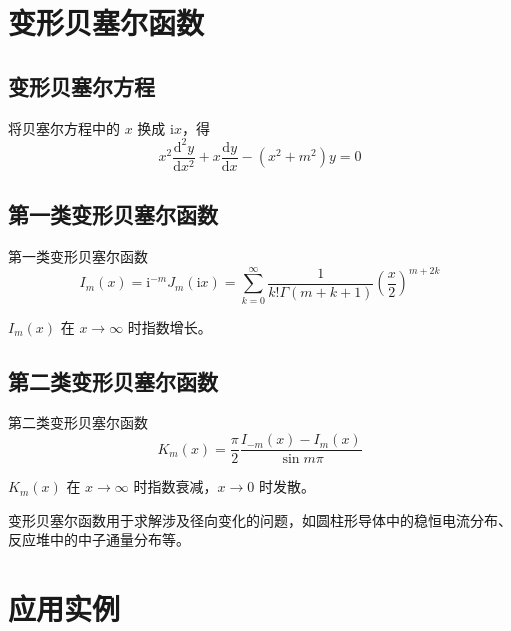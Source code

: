 \section{变形贝塞尔函数}

\subsection{变形贝塞尔方程}

将贝塞尔方程中的 $x$ 换成 $\mathrm{i}x$，得
\begin{equation}
    x^2\frac{\mathrm{d}^2 y}{\mathrm{d}x^2} + x\frac{\mathrm{d}y}{\mathrm{d}x} - (x^2 + m^2)y = 0
\end{equation}

\subsection{第一类变形贝塞尔函数}

\begin{dingliyi}{第一类变形贝塞尔函数}{}
\begin{equation}
    \boxed{I_m(x) = \mathrm{i}^{-m}J_m(\mathrm{i}x) = \sum_{k=0}^{\infty} \frac{1}{k!\Gamma(m+k+1)}\left(\frac{x}{2}\right)^{m+2k}}
\end{equation}
\end{dingliyi}

$I_m(x)$ 在 $x \to \infty$ 时指数增长。

\subsection{第二类变形贝塞尔函数}

\begin{dingliyi}{第二类变形贝塞尔函数}{}
\begin{equation}
    K_m(x) = \frac{\pi}{2}\frac{I_{-m}(x) - I_m(x)}{\sin m\pi}
\end{equation}
\end{dingliyi}

$K_m(x)$ 在 $x \to \infty$ 时指数衰减，$x \to 0$ 时发散。

\begin{wulibj}[应用]
变形贝塞尔函数用于求解涉及径向变化的问题，如圆柱形导体中的稳恒电流分布、反应堆中的中子通量分布等。
\end{wulibj}

\section{应用实例}

